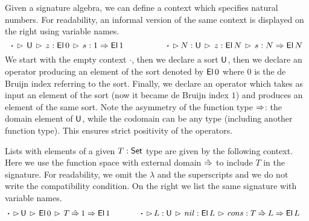 \documentclass[a4paper,UKenglish,cleveref, autoref]{lipics-v2019}
\begin{document}
\begin{example}\label{ex:contexts}
  Given a signature algebra, we can define a context which
  specifies natural numbers. For readability, an informal version
  of the same context is displayed on the right using variable names.
  \[
    \boldsymbol{\cdot}\,\rhd\,\mathsf{U}\,\rhd\,z : \mathsf{El}\,0\,\rhd\,s : 1 \Rightarrow \mathsf{El}\,1
    \hspace{4.9em}
    \boldsymbol{\cdot}\,\rhd\,N:\mathsf{U}\,\rhd\,z : \mathsf{El}\,N\,\rhd\,s : N \Rightarrow \mathsf{El}\,N
  \]
  We start with the empty context $\boldsymbol{\cdot}$, then we declare a sort
  $\mathsf{U}$, then we declare an operator producing an element of the sort denoted by
  $\mathsf{El}\,0$ where $0$ is the de Bruijn index referring to the sort. Finally, we
  declare an operator which takes as input an element of the sort (now it became
  de Bruijn index $1$) and produces an element of the same sort. Note the
  asymmetry of the function type $\Rightarrow$: the domain element of $\mathsf{U}$, while the
  codomain can be any type (including another function type). This ensures
  strict positivity of the operators.

  Lists with elements of a given $T : \mathsf{Set}$ type are given by the
  following context. Here we use the function space with external
  domain $\mathbin{\hat{\Rightarrow}}$ to include $T$ in the signature. For readability, we
  omit the $\lambda$ and the superscripts and we do not write the
  compatibility condition. On the right we list the same signature
  with variable names.
  \begin{alignat*}{10}
    & \boldsymbol{\cdot}\,\ext\,\U\,\ext\,\El\,0\,\ext\,T\Ram 1\Ra \El\,1 \hspace{3.56em} \boldsymbol{\cdot}\,\ext\,L:\U\,\ext\,nil : \El\,L\,\ext\,cons : T\Ram L\Ra \El\,L
  \end{alignat*}


\end{example}
\end{document}
